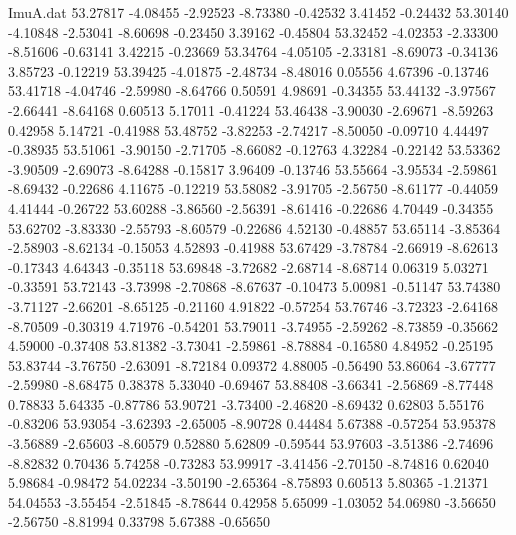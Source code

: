 \begin{filecontents}{ImuA.dat}
  53.27817   -4.08455   -2.92523   -8.73380   -0.42532    3.41452   -0.24432
  53.30140   -4.10848   -2.53041   -8.60698   -0.23450    3.39162   -0.45804
  53.32452   -4.02353   -2.33300   -8.51606   -0.63141    3.42215   -0.23669
  53.34764   -4.05105   -2.33181   -8.69073   -0.34136    3.85723   -0.12219
  53.39425   -4.01875   -2.48734   -8.48016    0.05556    4.67396   -0.13746
  53.41718   -4.04746   -2.59980   -8.64766    0.50591    4.98691   -0.34355
  53.44132   -3.97567   -2.66441   -8.64168    0.60513    5.17011   -0.41224
  53.46438   -3.90030   -2.69671   -8.59263    0.42958    5.14721   -0.41988
  53.48752   -3.82253   -2.74217   -8.50050   -0.09710    4.44497   -0.38935
  53.51061   -3.90150   -2.71705   -8.66082   -0.12763    4.32284   -0.22142
  53.53362   -3.90509   -2.69073   -8.64288   -0.15817    3.96409   -0.13746
  53.55664   -3.95534   -2.59861   -8.69432   -0.22686    4.11675   -0.12219
  53.58082   -3.91705   -2.56750   -8.61177   -0.44059    4.41444   -0.26722
  53.60288   -3.86560   -2.56391   -8.61416   -0.22686    4.70449   -0.34355
  53.62702   -3.83330   -2.55793   -8.60579   -0.22686    4.52130   -0.48857
  53.65114   -3.85364   -2.58903   -8.62134   -0.15053    4.52893   -0.41988
  53.67429   -3.78784   -2.66919   -8.62613   -0.17343    4.64343   -0.35118
  53.69848   -3.72682   -2.68714   -8.68714    0.06319    5.03271   -0.33591
  53.72143   -3.73998   -2.70868   -8.67637   -0.10473    5.00981   -0.51147
  53.74380   -3.71127   -2.66201   -8.65125   -0.21160    4.91822   -0.57254
  53.76746   -3.72323   -2.64168   -8.70509   -0.30319    4.71976   -0.54201
  53.79011   -3.74955   -2.59262   -8.73859   -0.35662    4.59000   -0.37408
  53.81382   -3.73041   -2.59861   -8.78884   -0.16580    4.84952   -0.25195
  53.83744   -3.76750   -2.63091   -8.72184    0.09372    4.88005   -0.56490
  53.86064   -3.67777   -2.59980   -8.68475    0.38378    5.33040   -0.69467
  53.88408   -3.66341   -2.56869   -8.77448    0.78833    5.64335   -0.87786
  53.90721   -3.73400   -2.46820   -8.69432    0.62803    5.55176   -0.83206
  53.93054   -3.62393   -2.65005   -8.90728    0.44484    5.67388   -0.57254
  53.95378   -3.56889   -2.65603   -8.60579    0.52880    5.62809   -0.59544
  53.97603   -3.51386   -2.74696   -8.82832    0.70436    5.74258   -0.73283
  53.99917   -3.41456   -2.70150   -8.74816    0.62040    5.98684   -0.98472
  54.02234   -3.50190   -2.65364   -8.75893    0.60513    5.80365   -1.21371
  54.04553   -3.55454   -2.51845   -8.78644    0.42958    5.65099   -1.03052
  54.06980   -3.56650   -2.56750   -8.81994    0.33798    5.67388   -0.65650

\end{filecontents}
